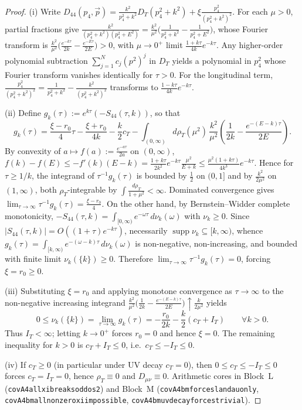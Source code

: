 \documentclass[11pt,a4paper]{article}
\theoremstyle{plain}
\theoremstyle{definition}
\theoremstyle{remark}
\renewcommand{\_}{\oldunderscore\allowbreak}
\newcommand{\Lean}[1]{\texttt{\small #1}}
\begin{document}
\begin{proof}
(i) Write $D_{44}(p_4,\vec p)=\frac{k^2}{p_4^2+k^2}D_T(p_4^2+k^2)+\xi\frac{p_4^2}{(p_4^2+k^2)^2}$. For each $\mu>0$, partial fractions give $\frac{k^2}{(p_4^2+k^2)(p_4^2+E^2)}=\frac{k^2}{\mu^2}\big(\frac{1}{p_4^2+k^2}-\frac{1}{p_4^2+E^2}\big)$, whose Fourier transform is $\frac{k^2}{\mu^2}\big(\frac{e^{-k\tau}}{2k}-\frac{e^{-E\tau}}{2E}\big)>0$, with $\mu\to0^+$ limit $\frac{1+k\tau}{4k}e^{-k\tau}$. Any higher-order polynomial subtraction $\sum_{j=1}^N c_j(p^2)^j$ in $D_T$ yields a polynomial in $p_4^2$ whose Fourier transform vanishes identically for $\tau>0$. For the longitudinal term, $\frac{p_4^2}{(p_4^2+k^2)^2}=\frac{1}{p_4^2+k^2}-\frac{k^2}{(p_4^2+k^2)^2}$ transforms to $\frac{1-k\tau}{4k}e^{-k\tau}$.

(ii) Define $g_k(\tau):=e^{k\tau}(-S_{44}(\tau,k))$, so that
\[
g_k(\tau)=\frac{\xi-r_0}{4}\tau-\frac{\xi+r_0}{4k}-\frac{k}{2}c_T-\int_{(0,\infty)}d\rho_T(\mu^2)\,\frac{k^2}{\mu^2}\!\left(\frac{1}{2k}-\frac{e^{-(E-k)\tau}}{2E}\right).
\]
By convexity of $a\mapsto f(a):=\frac{e^{-a\tau}}{2a}$ on $(0,\infty)$, $f(k)-f(E)\le -f'(k)(E-k)=\frac{1+k\tau}{2k^2}e^{-k\tau}\frac{\mu^2}{E+k}\le \frac{\mu^2(1+k\tau)}{4k^3}e^{-k\tau}$. Hence for $\tau\ge 1/k$, the integrand of $\tau^{-1}g_k(\tau)$ is bounded by $\frac{1}{2}$ on $(0,1]$ and by $\frac{k^2}{2\mu^2}$ on $(1,\infty)$, both $\rho_T$-integrable by $\int\frac{d\rho_T}{1+\mu^2}<\infty$. Dominated convergence gives $\lim_{\tau\to\infty}\tau^{-1}g_k(\tau)=\frac{\xi-r_0}{4}$. On the other hand, by Bernstein--Widder complete monotonicity, $-S_{44}(\tau,k)=\int_{[0,\infty)}e^{-\omega\tau}\,d\nu_k(\omega)$ with $\nu_k\ge0$. Since $|S_{44}(\tau,k)|=O((1+\tau)e^{-k\tau})$, necessarily $\operatorname{supp}\nu_k\subseteq[k,\infty)$, whence $g_k(\tau)=\int_{[k,\infty)}e^{-(\omega-k)\tau}\,d\nu_k(\omega)$ is non-negative, non-increasing, and bounded with finite limit $\nu_k(\{k\})\ge0$. Therefore $\lim_{\tau\to\infty}\tau^{-1}g_k(\tau)=0$, forcing $\xi=r_0\ge0$.

(iii) Substituting $\xi=r_0$ and applying monotone convergence as $\tau\to\infty$ to the non-negative increasing integrand $\frac{k^2}{\mu^2}\big(\frac{1}{2k}-\frac{e^{-(E-k)\tau}}{2E}\big)\uparrow \frac{k}{2\mu^2}$ yields
\[
0\le \nu_k(\{k\})=\lim_{\tau\to\infty}g_k(\tau)=-\frac{r_0}{2k}-\frac{k}{2}(c_T+I_T)\qquad \forall k>0.
\]
Thus $I_T<\infty$; letting $k\to0^+$ forces $r_0=0$ and hence $\xi=0$. The remaining inequality for $k>0$ is $c_T+I_T\le 0$, i.e.\ $c_T\le -I_T\le 0$.

(iv) If $c_T\ge0$ (in particular under UV decay $c_T=0$), then $0\le c_T\le -I_T\le 0$ forces $c_T=I_T=0$, hence $\rho_T\equiv0$ and $D_{\mu\nu}\equiv0$. Arithmetic cores in Block~L (\Lean{covA4\_all\_xi\_breaks\_odd\_os2}) and Block~M (\Lean{covA4\_bm\_forces\_landau\_only}, \Lean{covA4\_bm\_all\_nonzero\_xi\_impossible}, \Lean{covA4\_bm\_uv\_decay\_forces\_trivial}).


\end{proof}
\end{document}
